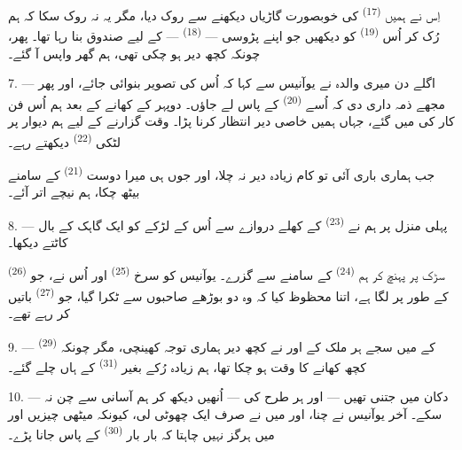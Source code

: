 اِس نے ہمیں  \textsuperscript{(17)} کی خوبصورت
گاڑیاں دیکھنے سے روک دیا، مگر یہ نہ روک سکا کہ ہم رُک کر اُس
 \textsuperscript{(19)} کو دیکھیں جو اپنے
پڑوسی —  \textsuperscript{(18)} —
کے لیے صندوق بنا رہا تھا۔ پھر، چونکہ کچھ دیر ہو چکی تھی، ہم گھر واپس
آ گئے۔

\VUsaut{3.0mm}

7. --- اگلے دن میری والدہ نے یوآنیس سے کہا کہ اُس کی تصویر بنوائی
جائے، اور پھر مجھے ذمہ داری دی کہ اُسے 
\textsuperscript{(20)} کے پاس لے جاؤں۔ دوپہر کے کھانے کے بعد ہم اُس
فن کار کی  میں گئے، جہاں ہمیں خاصی دیر انتظار کرنا
پڑا۔ وقت گزارنے کے لیے ہم دیوار پر لٹکی 
\textsuperscript{(22)} دیکھتے رہے۔

جب ہماری باری آئی تو کام زیادہ دیر نہ چلا، اور جوں ہی میرا دوست
 \textsuperscript{(21)} کے سامنے بیٹھ چکا، ہم نیچے اتر
آئے۔

8. --- پہلی منزل پر ہم نے  \textsuperscript{(23)} کے
کھلے دروازے سے اُس کے لڑکے کو ایک گاہک کے بال کاٹتے دیکھا۔

سڑک پر پہنچ کر ہم  \textsuperscript{(24)} کے
سامنے سے گزرے۔ یوآنیس کو سرخ  \textsuperscript{(25)}
اور اُس  نے، جو 
\textsuperscript{(26)} کے طور پر لگا ہے، اتنا محظوظ کیا کہ وہ دو بوڑھے
صاحبوں سے ٹکرا گیا، جو  \textsuperscript{(27)}
باتیں کر رہے تھے۔

\VUsaut{3.0mm}

9. ---  \textsuperscript{(29)} کے  میں
سجے ہر ملک کے  اور  نے کچھ دیر ہماری
توجہ کھینچی، مگر چونکہ کچھ کھانے کا وقت ہو چکا تھا، ہم زیادہ رُکے
بغیر  \textsuperscript{(31)} کے ہاں چلے گئے۔

10. --- دکان میں جتنی  تھیں — 
  اور ہر طرح کی  —
اُنھیں دیکھ کر ہم آسانی سے چن نہ سکے۔ آخر یوآنیس نے
 چنا، اور میں نے صرف ایک چھوٹی  لی، کیونکہ میٹھی چیزیں  اور میں ہرگز نہیں چاہتا کہ بار بار 
\textsuperscript{(30)} کے پاس جانا پڑے۔

\VUsaut{3.0mm}


